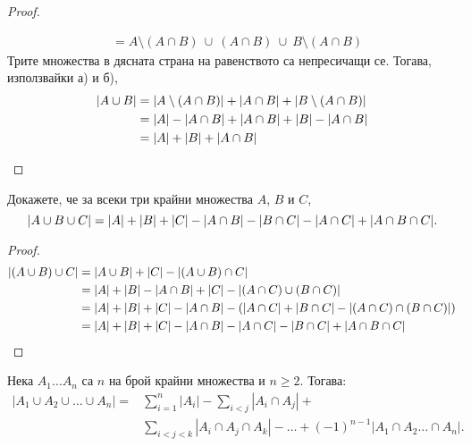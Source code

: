 \begin{proof}
\begin{enumerate}[a)]
\begin{align*}
      & = A\setminus (A\cap B)\ \cup\ (A\cap B)\ \cup\ B\setminus (A\cap B)
    \end{align*}
    Трите множества в дясната страна на равенството са непресичащи се.
    Тогава, използвайки а) и б), 
    \begin{align*}
      \lvert{A \cup B}\rvert & = \lvert{ A\setminus (A\cap B)}\rvert + \lvert{A\cap B}\rvert + \lvert{B\setminus (A\cap B)}\rvert\\
      & = \lvert{A}\rvert - \lvert{A\cap B}\rvert + \lvert{A \cap B}\rvert + \lvert{B}\rvert - \lvert{A\cap B}\rvert\\
      & = \lvert{A}\rvert + \lvert{B}\rvert + \lvert{A \cap B}\rvert
    \end{align*}
  \end{enumerate}
\end{proof}

\begin{prop}
  Докажете, че за всеки три крайни множества $A$, $B$ и $C$,
  \[\lvert{A\cup B \cup C}\rvert = \lvert{A}\rvert+\lvert{B}\rvert+\lvert{C}\rvert - \lvert{A\cap B}\rvert - \lvert{B\cap C}\rvert - \lvert{A\cap C}\rvert+ \lvert{A\cap B \cap C}\rvert.\]
\end{prop}
\begin{proof}
  \begin{align*}
    \lvert{(A \cup B) \cup C}\rvert & = \lvert{A \cup B}\rvert + \lvert{C}\rvert - \lvert{(A\cup B)\cap C}\rvert\\
    & = \lvert{A}\rvert + \lvert{B}\rvert - \lvert{A\cap B}\rvert + \lvert{C}\rvert - \lvert{(A\cap C)\cup(B\cap C)}\rvert\\
    & = \lvert{A}\rvert + \lvert{B}\rvert + \lvert{C}\rvert - \lvert{A\cap B}\rvert - (\lvert{A\cap C}\rvert + \lvert{B\cap C}\rvert - \lvert{(A\cap C) \cap (B\cap C)}\rvert)\\
    & = \lvert{A}\rvert + \lvert{B}\rvert + \lvert{C}\rvert - \lvert{A\cap B}\rvert - \lvert{A\cap C}\rvert - \lvert{B\cap C}\rvert + \lvert{A\cap B \cap C}\rvert
  \end{align*}
\end{proof}


\begin{framed}
\begin{thm}
  Нека $A_1\dots A_n$ са $n$ на брой крайни множества и $n\geq 2$. Тогава:
  \begin{align*}
    |A_1\cup A_2\cup \dots \cup A_n| = & \sum^n_{i=1} |A_i| - \sum_{i < j} |A_{i}\cap A_{j}| + \\
    & \sum_{i < j < k} |A_{i}\cap A_{j}\cap A_{k}|- \dots + (-1)^{n-1}|A_1 \cap A_2\dots \cap A_n|.    
  \end{align*}
\end{thm}
\end{framed}

